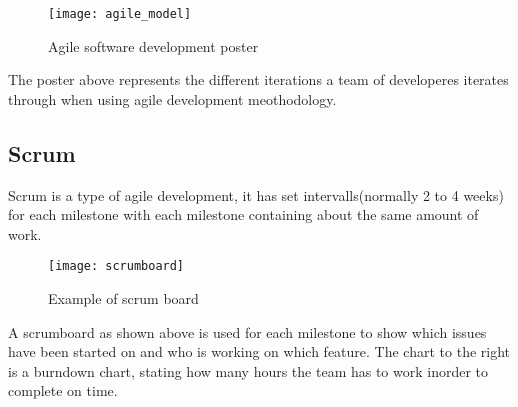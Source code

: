 \begin{figure}[!htpb]
\label{logo}
\centering
	\texttt{[image: agile\_model]}
\caption{Agile software development poster}
\end{figure}

The poster above represents the different iterations a team of developeres iterates through when using agile development meothodology.

\subsection{Scrum}
Scrum is a type of agile development, it has set intervalls(normally 2 to 4 weeks) for each milestone with each milestone containing about the same amount of work.

\begin{figure}[!htpb]
\label{logo}
\centering
	\texttt{[image: scrumboard]}
\caption{Example of scrum board}
\end{figure}

A scrumboard as shown above is used for each milestone to show which issues have been started on and who is working on which feature. The chart to the right is a burndown chart, stating how many hours the team has to work inorder to complete on time.